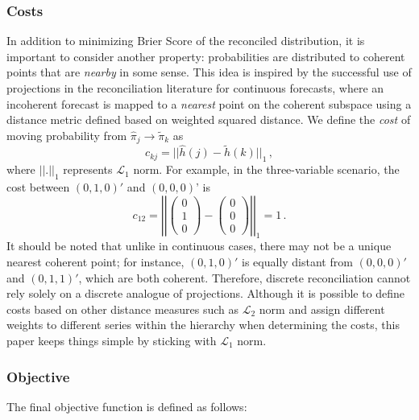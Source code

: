 \documentclass[a4paper,review,12pt,authoryear]{elsarticle}
\begin{document}
    \subsubsection*{\textbf{Costs}}
    In addition to minimizing Brier Score of the reconciled distribution, it is important to consider another property: probabilities are distributed to coherent points that are \emph{nearby} in some sense. 
    This idea is inspired by the successful use of projections in the reconciliation literature for continuous forecasts, where an incoherent forecast is mapped to  a \emph{nearest} point on the coherent subspace using a distance metric defined based on weighted squared distance.
    We define the \emph{cost} of moving probability from $\hat{\pi}_j\rightarrow\tilde{\pi}_k$ as
    \[
    c_{kj}=||\hat{h}(j)-\tilde{h}(k)||_1\,,
    \]
    where $||.||_1$ represents $\mathcal{L}_1$ norm. For example, in the three-variable scenario, the cost between $(0, 1, 0)'$ and $(0, 0, 0)$' is
    \[
    c_{12}=\left|\left|\begin{pmatrix}0\\1\\0\end{pmatrix}-\begin{pmatrix}0\\0\\0\end{pmatrix}\right|\right|_1=1\,.
    \]
    It should be noted that unlike in continuous cases, there may not be a unique nearest coherent point; for instance, $(0,1,0)'$ is equally distant from $(0,0,0)'$ and $(0,1,1)'$, which are both coherent. 
    Therefore, discrete reconciliation cannot rely solely on a discrete analogue of projections.
    Although it is possible to define costs based on other distance measures such as  $\mathcal{L}_2$ norm and assign different weights to different series within the hierarchy when determining the costs, this paper keeps things simple by sticking with  $\mathcal{L}_1$ norm.

    
    \subsubsection*{\textbf{Objective}}

    The final objective function is defined as follows:
    
\end{document}
